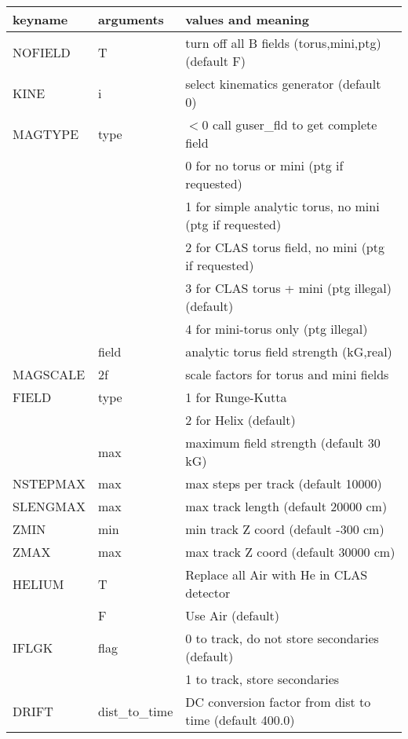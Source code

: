 \documentclass{article}
\begin{document}
\par
\begin{center}
\begin{tabular}{|l|l|l|} \hline
keyname   & arguments    &  values and meaning \\ \hline
NOFIELD   &  T       	 &  turn off all B fields (torus,mini,ptg) (default F) \\ \hline
KINE      &  i       	 &  select kinematics generator (default 0) \\ \hline
MAGTYPE   &  type    	 &  $<0$ call guser\_fld to get complete field \\
          &      	 &  0 for no torus or mini (ptg if requested) \\
	  &          	 &  1 for simple analytic torus, no mini (ptg if requested)  \\
	  &          	 &  2 for CLAS torus field, no mini (ptg if requested) \\
	  &          	 &  3 for CLAS torus + mini (ptg illegal) (default) \\
	  &          	 &  4 for mini-torus only (ptg illegal) \\
          &  field   	 &  analytic torus field strength (kG,real) \\ \hline
MAGSCALE  &  2f   	 &  scale factors for torus and mini fields \\ \hline
FIELD     &  type    	 &  1 for Runge-Kutta \\
          &          	 &  2 for Helix (default)\\
          &  max     	 &  maximum field strength (default 30 kG) \\ \hline
NSTEPMAX  &  max     	 &  max steps per track (default 10000) \\ \hline
SLENGMAX  &  max     	 &  max track length (default 20000 cm)\\ \hline
ZMIN	  &  min     	 &  min track Z coord (default -300 cm) \\ \hline
ZMAX	  &  max     	 &  max track Z coord (default 30000 cm)\\ \hline
HELIUM	  &  T     	 &  Replace all Air with He in CLAS detector\\
	  &  F     	 &  Use Air (default) \\ \hline
IFLGK     &  flag     	 &  0 to track, do not store secondaries (default) \\
          &  	     	 &  1 to track, store secondaries \\ \hline
DRIFT     &dist\_to\_time&  DC conversion factor from dist to time (default 400.0) \\ \hline

\end{tabular}
\end{center}
\end{document}
